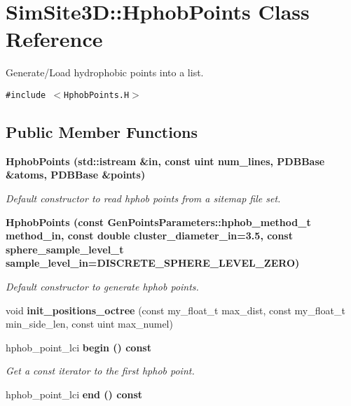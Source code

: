 \section{SimSite3D::Hphob\-Points Class Reference}
\label{classSimSite3D_1_1HphobPoints}
Generate/Load hydrophobic points into a list.  


{\tt \#include $<$Hphob\-Points.H$>$}

\subsection*{Public Member Functions}
\begin{CompactItemize}
\item 
\bf{Hphob\-Points} (std::istream \&in, const uint num\_\-lines, \bf{PDBBase} \&atoms, \bf{PDBBase} \&points)\label{classSimSite3D_1_1HphobPoints_1b600a08832fe2d624022f19b9e1cbf4}

\begin{CompactList}\small\item\em Default constructor to read hphob points from a sitemap file set. \item\end{CompactList}\item 
\bf{Hphob\-Points} (const \bf{Gen\-Points\-Parameters::hphob\_\-method\_\-t} method\_\-in, const double cluster\_\-diameter\_\-in=3.5, const sphere\_\-sample\_\-level\_\-t sample\_\-level\_\-in=DISCRETE\_\-SPHERE\_\-LEVEL\_\-ZERO)\label{classSimSite3D_1_1HphobPoints_570ce01d0cd1e8f1d59b93a48a2d4beb}

\begin{CompactList}\small\item\em Default constructor to generate hphob points. \item\end{CompactList}\item 
void \textbf{init\_\-positions\_\-octree} (const my\_\-float\_\-t max\_\-dist, const my\_\-float\_\-t min\_\-side\_\-len, const uint max\_\-numel)\label{classSimSite3D_1_1HphobPoints_07a9f3bb6d8abbbcb7622e420f912bfc}

\item 
hphob\_\-point\_\-lci \bf{begin} () const \label{classSimSite3D_1_1HphobPoints_5f178bbf8869f527b842cbda666e8348}

\begin{CompactList}\small\item\em Get a const iterator to the first hphob point. \item\end{CompactList}\item 
hphob\_\-point\_\-lci \bf{end} () const \label{classSimSite3D_1_1HphobPoints_980fffa0fabdd65b40ceec84c06067fc}


\end{CompactItemize}

